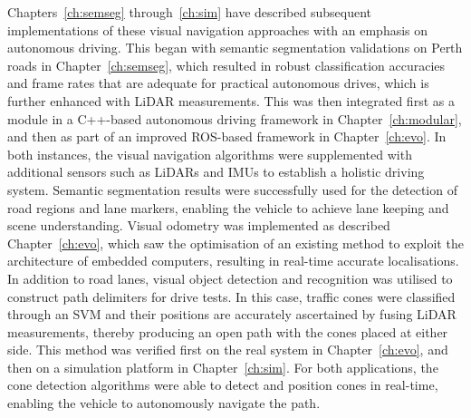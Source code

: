 Chapters~\ref{ch:semseg} through~\ref{ch:sim} have described subsequent implementations of these visual navigation approaches with an emphasis on autonomous driving. This began with semantic segmentation validations on Perth roads in Chapter~\ref{ch:semseg}, which resulted in robust classification accuracies and frame rates that are adequate for practical autonomous drives, which is further enhanced with LiDAR measurements. This was then integrated first as a module in a C++-based autonomous driving framework in Chapter~\ref{ch:modular}, and then as part of an improved ROS-based framework in Chapter~\ref{ch:evo}. In both instances, the visual navigation algorithms were supplemented with additional sensors such as LiDARs and IMUs to establish a holistic driving system. Semantic segmentation results were successfully used for the detection of road regions and lane markers, enabling the vehicle to achieve lane keeping and scene understanding. Visual odometry was implemented as described Chapter~\ref{ch:evo}, which saw the optimisation of an existing method to exploit the architecture of embedded computers, resulting in real-time accurate localisations. In addition to road lanes, visual object detection and recognition was utilised to construct path delimiters for drive tests. In this case, traffic cones were classified through an SVM and their positions are accurately ascertained by fusing LiDAR measurements, thereby producing an open path with the cones placed at either side. This method was verified first on the real system in Chapter~\ref{ch:evo}, and then on a simulation platform in Chapter~\ref{ch:sim}. For both applications, the cone detection algorithms were able to detect and position cones in real-time, enabling the vehicle to autonomously navigate the path. 

